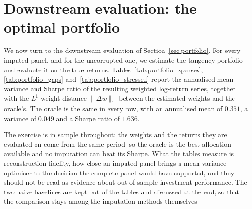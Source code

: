 \section{Downstream evaluation: the optimal portfolio}
\label{sec:results_portfolio}

We now turn to the downstream evaluation of Section~\ref{sec:portfolio}. For
every imputed panel, and for the uncorrupted one, we estimate the tangency
portfolio and evaluate it on the true returns.
Tables~\ref{tab:portfolio_sparses}, \ref{tab:portfolio_gaps}
and~\ref{tab:portfolio_stressed} report the annualised mean, variance and Sharpe
ratio of the resulting weighted log-return series, together with the $L^1$ weight
distance $\lVert \Delta w \rVert_1$ between the estimated weights and the
oracle's. The oracle is the same in every row, with an annualised mean of
$0.361$, a variance of $0.049$ and a Sharpe ratio of $1.636$.

The exercise is in sample throughout: the weights and the returns they are
evaluated on come from the same period, so the oracle is the best allocation
available and no imputation can beat its Sharpe. What the tables measure is
reconstruction fidelity, how close an imputed panel brings a mean-variance
optimiser to the decision the complete panel would have supported, and they
should not be read as evidence about out-of-sample investment performance. The
two naive baselines are kept out of the tables and discussed at the end, so that
the comparison stays among the imputation methods themselves.

